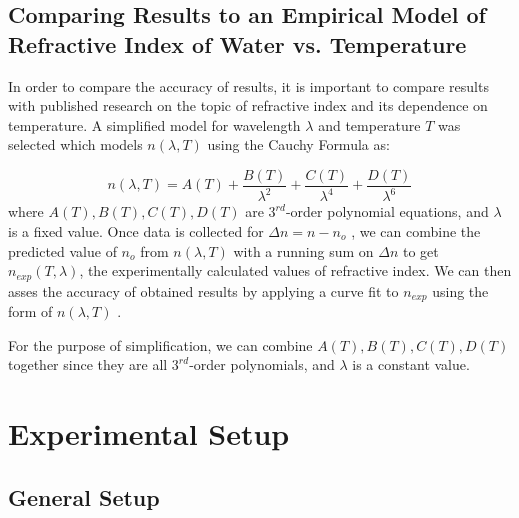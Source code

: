 \documentclass{article}
\begin{document}
\subsection{  Comparing Results to an Empirical Model of Refractive Index of Water vs. Temperature }\label{sec:comparing_results_to_an_empirical_model_of_refractive_index_of_water_vs._temperature }\label{subsec:_comparing_results_to_an_empirical_model_of_refractive_index_of_water_vs._temperature_}\label{sec:comparing_results_to_an_empirical_model_of_refractive_index_of_water_vs._temperature}
In order to compare the accuracy of results, it is important to compare results with published research on the topic of refractive index and its dependence on temperature. A simplified model for wavelength $\lambda$ and temperature $T$ was selected\cite{n_T_emp_model} which models $n(\lambda,T)$ using the Cauchy Formula as:

\begin{equation}
	 n(\lambda,T) =  A(T) + \dfrac{B(T)}{\lambda^2}  + \dfrac{C(T)}{\lambda^4}   + \dfrac{D(T)}{\lambda^6}
\end{equation}
where $A(T),B(T),C(T),D(T)$ are $3^{rd}$-order polynomial equations,
and $\lambda$ is a fixed value. Once data is collected for $\Delta{n} = n-n_o$ , we can
combine the predicted value of $n_o$ from $n(\lambda,T)$ with a running sum on $\Delta{n}$ to get $n_{exp}(T,\lambda)$, the experimentally calculated values of refractive index. We can then asses the accuracy of obtained results by applying a curve fit to $n_{exp}$ using the form of $n(\lambda,T)$ .

For the purpose of simplification, we can combine $A(T),B(T),C(T),D(T)$ together since they are all $3^{rd}$-order polynomials,
and $\lambda$ is a constant value. 


\section{  Experimental Setup }\label{sec:experimental_setup }\label{sec:_experimental_setup_}\label{sec:experimental_setup}

\subsection{  General Setup}\label{subsec:exp_setup_general_setup }\label{sec:general_setup}\label{subsec:exp_setup_general_setup }\label{subsec:_general_setup}\label{subsec:exp_setup_general_setup_}\label{sec:general_setup}\label{subsec:exp_setup_general_setup}
\end{document}
